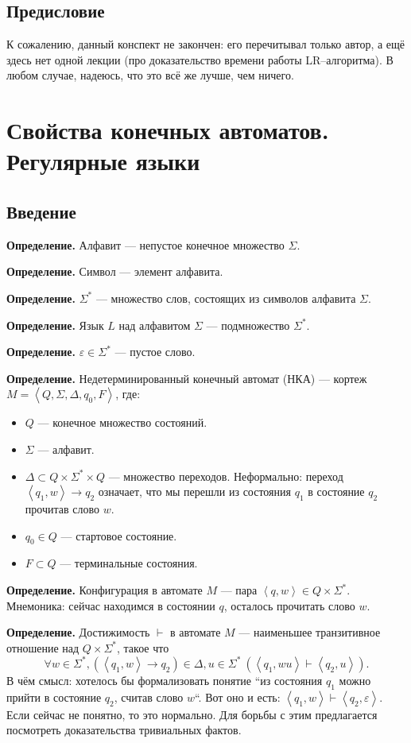 \subsection{Предисловие}
К сожалению, данный конспект не закончен: его перечитывал только автор, а ещё здесь нет одной лекции (про доказательство времени работы LR--алгоритма).
В любом случае, надеюсь, что это всё же лучше, чем ничего.

\section{Свойства конечных автоматов. Регулярные языки}
\subsection{Введение}
\textbf{Определение.} Алфавит --- непустое конечное множество $\Sigma$.

\textbf{Определение.} Символ --- элемент алфавита.

\textbf{Определение.} $\Sigma^*$ --- множество слов, состоящих из символов алфавита $\Sigma$.

\textbf{Определение.} Язык $L$ над алфавитом $\Sigma$ --- подмножество $\Sigma^*$.

\textbf{Определение.} $\varepsilon \in \Sigma^*$ --- пустое слово.

\textbf{Определение.} Недетерминированный конечный автомат (НКА) --- кортеж $M = \left<Q, \Sigma, \Delta, q_0, F \right>$, где:
\begin{itemize}
    \item $Q$ --- конечное множество состояний.
    \item $\Sigma$ --- алфавит.
    \item $\Delta \subset Q \times \Sigma^* \times Q$ --- множество переходов. Неформально: переход $\left<q_1, w \right> \to q_2$ означает, что мы перешли из состояния $q_1$ в состояние $q_2$ прочитав слово $w$.
    \item $q_0 \in Q$ --- стартовое состояние.
    \item $F \subset Q$ --- терминальные состояния.
\end{itemize}

\textbf{Определение.} Конфигурация в автомате $M$ --- пара $\left<q, w \right> \in Q \times \Sigma^*$. Мнемоника: сейчас находимся в состоянии $q$, осталось прочитать слово $w$.

\textbf{Определение.} Достижимость $\vdash$ в автомате $M$ --- наименьшее транзитивное отношение над $Q \times \Sigma^*$, такое что
\[
    \forall w \in \Sigma^*, (\left<q_1, w \right> \to q_2) \in \Delta, u \in \Sigma^*~(\left<q_1, wu \right> \vdash \left<q_2, u \right>).
\]
В чём смысл: хотелось бы формализовать понятие ``из состояния $q_1$ можно прийти в состояние $q_2$, считав слово $w$``.
Вот оно и есть: $\left<q_1, w \right> \vdash \left<q_2, \varepsilon \right>$.
Если сейчас не понятно, то это нормально. Для борьбы с этим предлагается посмотреть доказательства тривиальных фактов.

